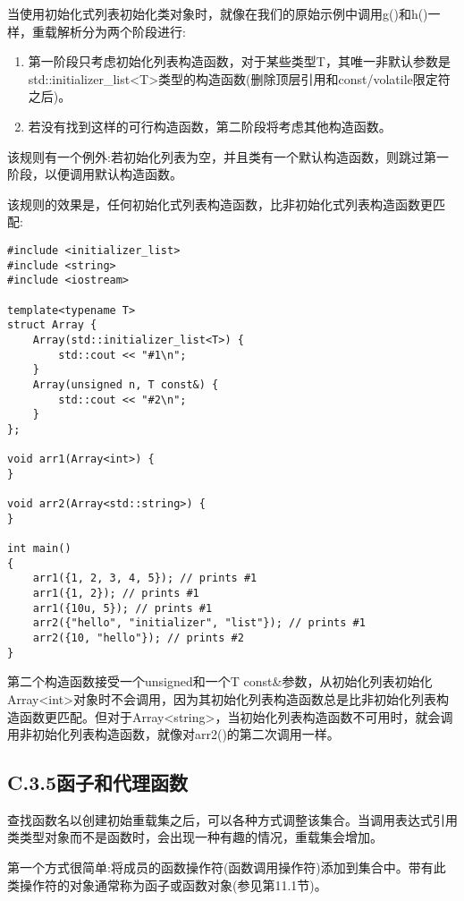 当使用初始化式列表初始化类对象时，就像在我们的原始示例中调用g()和h()一样，重载解析分为两个阶段进行:

\begin{enumerate}
\item
第一阶段只考虑初始化列表构造函数，对于某些类型T，其唯一非默认参数是std::initializer\_list<T>类型的构造函数(删除顶层引用和const/volatile限定符之后)。

\item
若没有找到这样的可行构造函数，第二阶段将考虑其他构造函数。
\end{enumerate}

该规则有一个例外:若初始化列表为空，并且类有一个默认构造函数，则跳过第一阶段，以便调用默认构造函数。

该规则的效果是，任何初始化式列表构造函数，比非初始化式列表构造函数更匹配:

\begin{lstlisting}[style=styleCXX]
#include <initializer_list>
#include <string>
#include <iostream>

template<typename T>
struct Array {
	Array(std::initializer_list<T>) {
		std::cout << "#1\n";
	}
	Array(unsigned n, T const&) {
		std::cout << "#2\n";
	}
};

void arr1(Array<int>) {
}

void arr2(Array<std::string>) {
}

int main()
{
	arr1({1, 2, 3, 4, 5}); // prints #1
	arr1({1, 2}); // prints #1
	arr1({10u, 5}); // prints #1
	arr2({"hello", "initializer", "list"}); // prints #1
	arr2({10, "hello"}); // prints #2
}
\end{lstlisting}

第二个构造函数接受一个unsigned和一个T const\&参数，从初始化列表初始化Array<int>对象时不会调用，因为其初始化列表构造函数总是比非初始化列表构造函数更匹配。但对于Array<string>，当初始化列表构造函数不可用时，就会调用非初始化列表构造函数，就像对arr2()的第二次调用一样。

\subsection{C.3.5\hspace{0.2cm}函子和代理函数}

查找函数名以创建初始重载集之后，可以各种方式调整该集合。当调用表达式引用类类型对象而不是函数时，会出现一种有趣的情况，重载集会增加。

第一个方式很简单:将成员的函数操作符(函数调用操作符)添加到集合中。带有此类操作符的对象通常称为函子或函数对象(参见第11.1节)。

